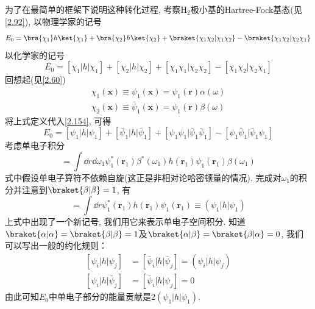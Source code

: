 为了在最简单的框架下说明这种转化过程, 
考察$\mathrm{H}_2$极小基的Hartree-Fock基态(见\autoref{2.92}), 
以物理学家的记号
\begin{equation}
E_0 = \bra{\chi_1}h\ket{\chi_1} + \bra{\chi_2}h\ket{\chi_2} + \braket{\chi_1\chi_2|\chi_1\chi_2} - \braket{\chi_1\chi_2|\chi_2\chi_1}
\end{equation}
以化学家的记号
\begin{equation}
\label{2.154}
E_0 = [{\chi_1|h|\chi_1}] + [{\chi_2|h|\chi_2}] + [{\chi_1\chi_1|\chi_2\chi_2}] - [{\chi_1\chi_2|\chi_2\chi_1}]
\end{equation}
回想起(见\autoref{2.60})
\begin{align}
\chi_1(\mathbf{x})\equiv \psi_1(\mathbf{x}) = \psi_1(\mathbf{\mathbf{r}})\alpha(\omega)\\
\chi_2(\mathbf{x})\equiv \bar{\psi}_1(\mathbf{x}) = \psi_1(\mathbf{\mathbf{r}})\beta(\omega)
\end{align}
将上式定义代入\autoref{2.154}, 
可得
\begin{equation}
\label{2.157}
E_0 = [{\psi_1|h|\psi_1}] + [{\bar{\psi}_1|h|\bar{\psi}_1}] + [{\psi_1\psi_1|\bar{\psi}_1\bar{\psi}_1}] - [{\psi_1\bar{\psi}_1|\bar{\psi}_1\psi_1}]
\end{equation}
考虑单电子积分
\begin{equation}
[\bar{\psi}_1|h|\bar{\psi}_1] = \int\dd{r}\dd\omega_1\psi_1^*(\mathbf{r}_1)\beta^*(\omega_1)h(\mathbf{r}_1)\psi_1(\mathbf{r}_1)\beta(\omega_1)
\end{equation}
式中假设单电子算符不依赖自旋(这正是非相对论哈密顿量的情况). 
完成对$\omega_1$的积分并注意到$\braket{\beta|\beta}=1$, 
有
\begin{equation}
[\bar{\psi}_1|h|\bar{\psi}_1] =\int\dd{r}\psi_1^*(\mathbf{r}_1)h(\mathbf{r}_1)\psi_1(\mathbf{r}_1) \equiv (\psi_1|h|\psi_1)
\end{equation}
上式中出现了一个新记号, 
我们用它来表示单电子空间积分. 
知道$\braket{\alpha|\alpha}=\braket{\beta|\beta}=1$及$\braket{\alpha|\beta}=\braket{\beta|\alpha}=0$, 
我们可以写出一般的约化规则：
\begin{align}
\label{2.160}
[{\psi}_i|h|{\psi}_j] & = [\bar{\psi}_i|h|\bar{\psi}_j] = (\psi_i|h|\psi_j)\\
[{\psi}_i|h|\bar{\psi}_j] & = [\bar{\psi}_i|h|\psi_j] = 0 
\label{2.161}
\end{align}
由此可知$E_0$中单电子部分的能量贡献是$2(\psi_1|h|\psi_1)$.


